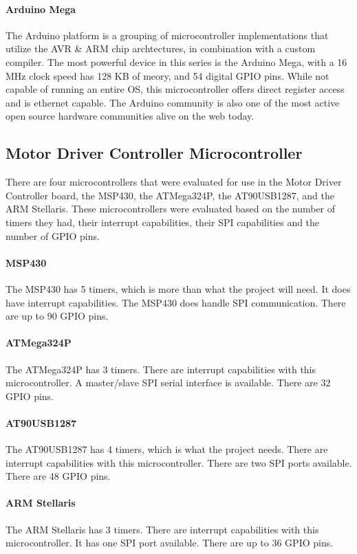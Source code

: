 \paragraph{Arduino Mega}
The Arduino platform is a grouping of microcontroller implementations that utilize the AVR \& ARM chip archtectures, in combination with a custom compiler.
The most powerful device in this series is the Arduino Mega, with a 16 MHz clock speed has 128 KB of meory, and 54 digital GPIO pins.
While not capable of running an entire OS, this microcontroller offers direct register access and is ethernet capable.
The Arduino community is also one of the most active open source hardware communities alive on the web today.


\subsection{Motor Driver Controller Microcontroller}
There are four microcontrollers that were evaluated for use in the Motor Driver Controller board, the MSP430, the ATMega324P, the AT90USB1287, and the ARM Stellaris.
These microcontrollers were evaluated based on the number of timers they had, their interrupt capabilities, their SPI capabilities and the number of GPIO pins.

\paragraph{MSP430} The MSP430 has 5 timers, which is more than what the project will need.
It does have interrupt capabilities.
The MSP430 does handle SPI communication. 
There are up to 90 GPIO pins.

\paragraph{ATMega324P} The ATMega324P has 3 timers.
There are interrupt capabilities with this microcontroller.
A master/slave SPI serial interface is available.
There are 32 GPIO pins.   

\paragraph{AT90USB1287} The AT90USB1287 has 4 timers, which is what the project needs.
There are interrupt capabilities with this microcontroller.
There are two SPI ports available. 
There are 48 GPIO pins.

\paragraph{ARM Stellaris} The ARM Stellaris has 3 timers.
There are interrupt capabilities with this microcontroller.
It has one SPI port available.
There are up to 36 GPIO pins.

